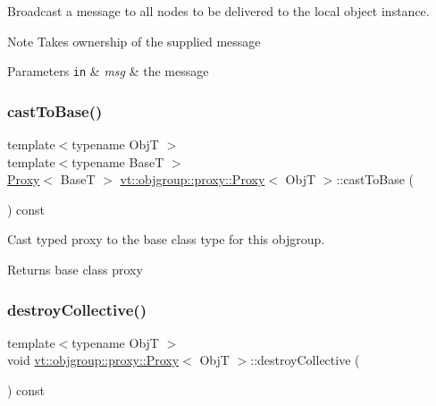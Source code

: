 Broadcast a message to all nodes to be delivered to the local object instance. 

\begin{DoxyNote}{Note}
Takes ownership of the supplied message
\end{DoxyNote}

\begin{DoxyParams}[1]{Parameters}
\mbox{\tt in}  & {\em msg} & the message \\
\hline
\end{DoxyParams}
\mbox{\label{structvt_1_1objgroup_1_1proxy_1_1_proxy_a28d396f4a46a50150ee94ec754c1ae85}} 
\subsubsection{\texorpdfstring{cast\+To\+Base()}{castToBase()}}
{\footnotesize\ttfamily template$<$typename ObjT $>$ \\
template$<$typename BaseT $>$ \\
\hyperlink{structvt_1_1objgroup_1_1proxy_1_1_proxy}{Proxy}$<$ BaseT $>$ \hyperlink{structvt_1_1objgroup_1_1proxy_1_1_proxy}{vt\+::objgroup\+::proxy\+::\+Proxy}$<$ ObjT $>$\+::cast\+To\+Base (\begin{DoxyParamCaption}{ }\end{DoxyParamCaption}) const}



Cast typed proxy to the base class type for this objgroup. 

\begin{DoxyReturn}{Returns}
base class proxy 
\end{DoxyReturn}
\mbox{\label{structvt_1_1objgroup_1_1proxy_1_1_proxy_a6758c7979d1f69722449cb78f998cbf1}} 
\subsubsection{\texorpdfstring{destroy\+Collective()}{destroyCollective()}}
{\footnotesize\ttfamily template$<$typename ObjT $>$ \\
void \hyperlink{structvt_1_1objgroup_1_1proxy_1_1_proxy}{vt\+::objgroup\+::proxy\+::\+Proxy}$<$ ObjT $>$\+::destroy\+Collective (\begin{DoxyParamCaption}{ }\end{DoxyParamCaption}) const}



